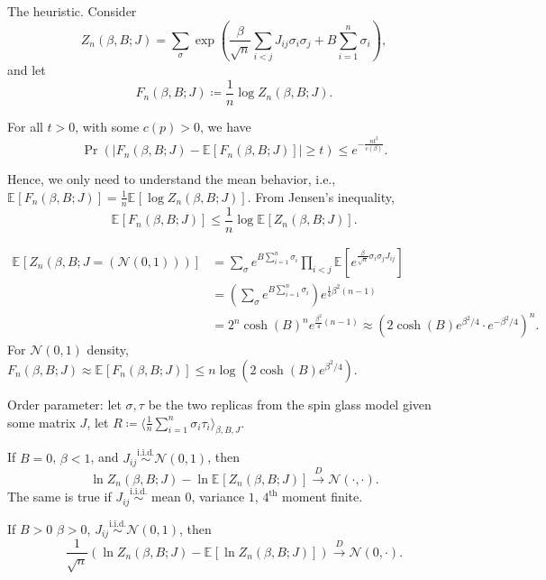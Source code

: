 The heuristic. Consider
\[
	Z_n(\beta , B; J)
	= \sum_{\sigma } \exp (\frac{\beta }{\sqrt{n} } \sum_{i < j} J_{ij} \sigma _i \sigma _j + B \sum_{i=1}^{n} \sigma _i),
\]
and let
\[
	F_n(\beta , B; J)
	\coloneqq \frac{1}{n} \log Z_n(\beta , B; J).
\]

\begin{theorem}
	For all \(t > 0\), with some \(c(p) > 0\), we have
	\[
		\Pr_{}\left(\lvert F_n(\beta , B; J) - \mathbb{E}_{}[F_n(\beta , B; J)] \rvert \geq t \right)
		\leq e^{- \frac{n t^2}{c(\beta )}}.
	\]
\end{theorem}

Hence, we only need to understand the mean behavior, i.e., \(\mathbb{E}_{}[F_n(\beta , B; J)] = \frac{1}{n} \mathbb{E}_{}[\log Z_n(\beta , B; J)] \). From Jensen's inequality,
\[
	\mathbb{E}_{}[F_n(\beta , B; J)]
	\leq \frac{1}{n} \log \mathbb{E}_{}[Z_n(\beta , B; J)].
\]

\begin{eg}
	\[
		\begin{split}
			\mathbb{E}_{}[Z_n(\beta , B; J = (\mathcal{N} (0, 1)))]
			 & = \sum_{\sigma } e^{B \sum_{i=1}^{n} \sigma _i} \prod_{i<j} \mathbb{E}_{}[e^{\frac{\beta }{\sqrt{n} } \sigma _i \sigma _j J_{ij}}] \\
			 & = \left( \sum_{\sigma } e^{B \sum_{i=1}^{n} \sigma _i} \right) e^{\frac{1}{4} \beta ^2 (n - 1)}                                    \\
			 & = 2^n \cosh(B)^n e^{\frac{\beta ^2}{4} (n-1)}
			\approx \left( 2 \cosh(B) e^{\beta ^2 / 4} \cdot e^{- \beta ^2 / 4}\right) ^n.
		\end{split}
	\]
	For \(\mathcal{N} (0, 1)\) density, \(F_n(\beta , B; J) \approx \mathbb{E}_{}[F_n(\beta , B; J)] \leq n \log (2 \cosh(B) e^{\beta ^2 / 4})\).
\end{eg}

Order parameter: let \(\sigma , \tau \) be the two replicas from the spin glass model given some matrix \(J\), let \(R \coloneqq \langle \frac{1}{n}\sum_{i=1}^{n} \sigma _i \tau _i \rangle _{\beta , B, J}\).

\begin{theorem}
	If \(B = 0\), \(\beta < 1\), and \(J_{ij} \overset{\text{i.i.d.} }{\sim } \mathcal{N} (0, 1)\), then
	\[
		\ln Z_n(\beta , B; J) - \ln \mathbb{E}_{}[Z_n(\beta , B; J)]
		\overset{D}{\to} \mathcal{N} (\cdot, \cdot).
	\]
	The same is true if \(J_{ij} \overset{\text{i.i.d.} }{\sim } \) mean \(0\), variance \(1\), \(4^{\text{th} }\) moment finite.
\end{theorem}

\begin{theorem}
	If \(B > 0\) \(\beta > 0\), \(J_{ij} \overset{\text{i.i.d.} }{\sim } \mathcal{N} (0, 1)\), then
	\[
		\frac{1}{\sqrt{n} } \left( \ln Z_n(\beta , B; J) - \mathbb{E}_{}[\ln Z_n(\beta , B; J)]  \right)
		\overset{D}{\to} \mathcal{N} (0, \cdot).
	\]
\end{theorem}